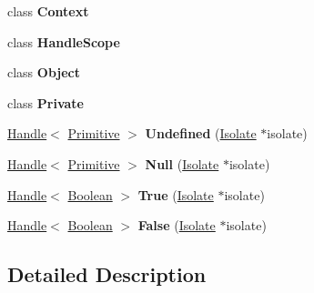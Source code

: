 \begin{DoxyCompactItemize}
\item 
\hypertarget{classv8_1_1Handle_ac26c806e60ca4a0547680edb68f6e39b}{}class {\bfseries Context}\label{classv8_1_1Handle_ac26c806e60ca4a0547680edb68f6e39b}

\item 
\hypertarget{classv8_1_1Handle_a5f127e488db492b05c8542cec0b880b7}{}class {\bfseries Handle\+Scope}\label{classv8_1_1Handle_a5f127e488db492b05c8542cec0b880b7}

\item 
\hypertarget{classv8_1_1Handle_a0720b5f434e636e22a3ed34f847eec57}{}class {\bfseries Object}\label{classv8_1_1Handle_a0720b5f434e636e22a3ed34f847eec57}

\item 
\hypertarget{classv8_1_1Handle_ac96b60d37bd806132da680e187dc2288}{}class {\bfseries Private}\label{classv8_1_1Handle_ac96b60d37bd806132da680e187dc2288}

\item 
\hypertarget{classv8_1_1Handle_a54e0b3d94c2292e9f7d4fc1618ecfdd6}{}\hyperlink{classv8_1_1Handle}{Handle}$<$ \hyperlink{classv8_1_1Primitive}{Primitive} $>$ {\bfseries Undefined} (\hyperlink{classv8_1_1Isolate}{Isolate} $\ast$isolate)\label{classv8_1_1Handle_a54e0b3d94c2292e9f7d4fc1618ecfdd6}

\item 
\hypertarget{classv8_1_1Handle_a495be557de6f0ea3848a2e8fc6505577}{}\hyperlink{classv8_1_1Handle}{Handle}$<$ \hyperlink{classv8_1_1Primitive}{Primitive} $>$ {\bfseries Null} (\hyperlink{classv8_1_1Isolate}{Isolate} $\ast$isolate)\label{classv8_1_1Handle_a495be557de6f0ea3848a2e8fc6505577}

\item 
\hypertarget{classv8_1_1Handle_a29e5558f47ee7c44b54dc3c20eaceb32}{}\hyperlink{classv8_1_1Handle}{Handle}$<$ \hyperlink{classv8_1_1Boolean}{Boolean} $>$ {\bfseries True} (\hyperlink{classv8_1_1Isolate}{Isolate} $\ast$isolate)\label{classv8_1_1Handle_a29e5558f47ee7c44b54dc3c20eaceb32}

\item 
\hypertarget{classv8_1_1Handle_af328581ad265dc321eb55a587708eedc}{}\hyperlink{classv8_1_1Handle}{Handle}$<$ \hyperlink{classv8_1_1Boolean}{Boolean} $>$ {\bfseries False} (\hyperlink{classv8_1_1Isolate}{Isolate} $\ast$isolate)\label{classv8_1_1Handle_af328581ad265dc321eb55a587708eedc}

\end{DoxyCompactItemize}


\subsection{Detailed Description}

